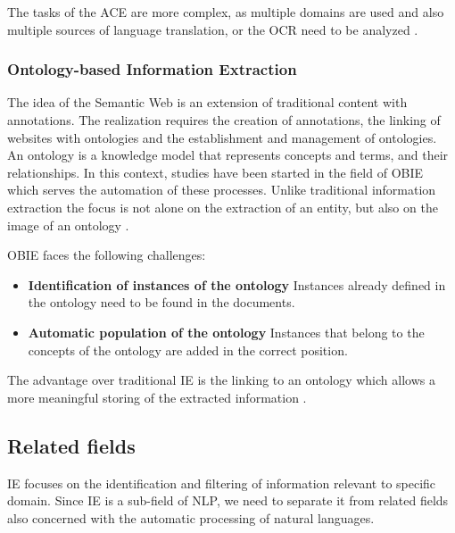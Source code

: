 The tasks of the \gls{ACE} are more complex, as multiple domains are used and also multiple sources of language translation, or the \gls{OCR} need to be analyzed \cite{Cunningham:2005}.

\subsubsection{Ontology-based Information Extraction}
The idea of the Semantic Web is an extension of traditional content with annotations. The realization requires the creation of annotations, the linking of websites with ontologies and the establishment and management of ontologies. An ontology is a knowledge model that represents concepts and terms, and their relationships. In this context, studies have been started in the field of \gls{OBIE} which serves the automation of these processes. Unlike traditional information extraction the focus is not alone on the extraction of an entity, but also on the image of an ontology \cite{Cunningham:2005}\cite{Maynard:2005}\cite{Weinhofer:2010}\cite{Linsmayr:2010}.

\gls{OBIE} faces the following challenges:

\begin{itemize}
\item \textbf{Identification of instances of the ontology} \newline
Instances already defined in the ontology need to be found in the documents.
\item \textbf{Automatic population of the ontology} \newline
Instances that belong to the concepts of the ontology are added in the correct position.
\end{itemize}

The advantage over traditional IE is the linking to an ontology which allows a more meaningful storing of the extracted information \cite{Maynard:2005}.

\newpage
\subsection{Related fields}
\gls{IE} focuses on the identification and filtering of information relevant to specific domain. Since \gls{IE} is a sub-field of \gls{NLP}, we need to separate it from related fields also concerned with the automatic processing of natural languages.

